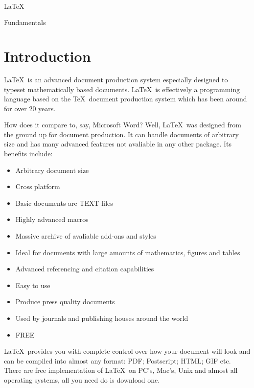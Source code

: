 \documentclass[12pt, a4paper]{book}
\begin{document}
\begin{titlepage}
\centering
\mbox{\ }
\vspace{5cm}

{\Huge \LaTeX}

\vspace{1cm}

{\huge Fundamentals}
\end{titlepage}




\section*{Introduction}
\LaTeX\ is an advanced document production system especially designed to typeset mathematically based documents.  \LaTeX\ is effectively a programming language based on the \TeX\ document production system which has been around for over $20$ years.

How does it compare to, say, Microsoft Word?  Well, \LaTeX\ was designed from the ground up for document production.  It can handle documents of arbitrary size and has many advanced features not avaliable in any other package.  Its benefits include:
\begin{itemize}
\item Arbitrary document size
\item Cross platform
\item Basic documents are TEXT files
\item Highly advanced macros
\item Massive archive of avaliable add-ons and styles
\item Ideal for documents with large amounts of mathematics, figures and tables
\item Advanced referencing and citation capabilities
\item Easy to use
\item Produce press quality documents
\item Used by journals and publishing houses around the world
\item FREE
\end{itemize}

\LaTeX\ provides you with complete control over how your document will look and can be compiled into almost any format: PDF; Postscript; HTML; GIF etc.  There are free implementation of \LaTeX\ on PC's, Mac's, Unix and almost all operating systems, all you need do is download one.
\end{document}
